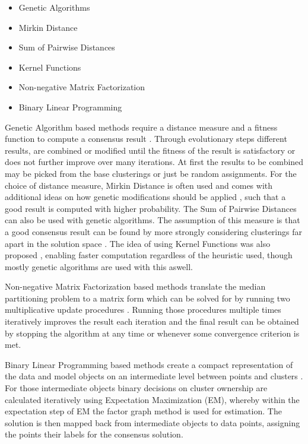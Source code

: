 \documentclass[
	a4paper,
	english,
	twoside,
	openright,               
	11pt                            
	]{report}
\begin{document}
\begin{itemize}
  \item Genetic Algorithms
  \item Mirkin Distance
  \item Sum of Pairwise Distances
  \item Kernel Functions
  \item Non-negative Matrix Factorization
  \item Binary Linear Programming
\end{itemize}

Genetic Algorithm based methods require a distance measure and a fitness function to compute a consensus result \cite{Cristofor2002FindingMP}. Through evolutionary steps different results, are combined or modified until the fitness of the result is satisfactory or does not further improve over many iterations. At first the results to be combined may be picked from the base clusterings or just be random assignments. For the choice of distance measure, Mirkin Distance is often used and comes with additional ideas on how genetic modifications should be applied \cite{5766165}, such that a good result is computed with higher probability. The Sum of Pairwise Distances can also be used with genetic algorithms. The assumption of this measure is that a good consensus result can be found by more strongly considering clusterings far apart in the solution space \cite{6694095}. The idea of using Kernel Functions was also proposed \cite{Vega-Pons:2010:WPC:1786814.1787121}, enabling faster computation regardless of the heuristic used, though mostly genetic algorithms are used with this aswell.

Non-negative Matrix Factorization based methods translate the median partitioning problem to a matrix form which can be solved for by running two multiplicative update procedures \cite{Li:2007:SCS:1441428.1442121}. Running those procedures multiple times iteratively improves the result each iteration and the final result can be obtained by stopping the algorithm at any time or whenever some convergence criterion is met.

Binary Linear Programming based methods create a compact representation of the data and model objects on an intermediate level between points and clusters \cite{HUANG2016131}. For those intermediate objects binary decisions on cluster ownership are calculated iteratively using Expectation Maximization (EM), whereby within the expectation step of EM the factor graph method \cite{HUANG2016131} is used for estimation. The solution is then mapped back from intermediate objects to data points, assigning the points their labels for the consensus solution.
\end{document}

